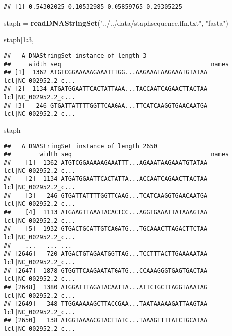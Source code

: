 \documentclass[]{article}
\newenvironment{Shaded}{\begin{snugshade}}{\end{snugshade}}
\newcommand{\KeywordTok}[1]{\textcolor[rgb]{0.13,0.29,0.53}{\textbf{#1}}}
\newcommand{\DecValTok}[1]{\textcolor[rgb]{0.00,0.00,0.81}{#1}}
\newcommand{\StringTok}[1]{\textcolor[rgb]{0.31,0.60,0.02}{#1}}
\newcommand{\OperatorTok}[1]{\textcolor[rgb]{0.81,0.36,0.00}{\textbf{#1}}}
\newcommand{\NormalTok}[1]{#1}
\begin{document}
\begin{verbatim}
## [1] 0.54302025 0.10532985 0.05859765 0.29305225
\end{verbatim}

\begin{Shaded}
\begin{Highlighting}[]
\NormalTok{staph =}\StringTok{ }\KeywordTok{readDNAStringSet}\NormalTok{(}\StringTok{"../../data/staphsequence.ffn.txt"}\NormalTok{, }\StringTok{"fasta"}\NormalTok{)}
\end{Highlighting}
\end{Shaded}

\begin{Shaded}
\begin{Highlighting}[]
\NormalTok{staph[}\DecValTok{1}\OperatorTok{:}\DecValTok{3}\NormalTok{, ]}
\end{Highlighting}
\end{Shaded}

\begin{verbatim}
##   A DNAStringSet instance of length 3
##     width seq                                          names               
## [1]  1362 ATGTCGGAAAAAGAAATTTGG...AAGAAATAAGAAATGTATAA lcl|NC_002952.2_c...
## [2]  1134 ATGATGGAATTCACTATTAAA...TACCAATCAGAACTTACTAA lcl|NC_002952.2_c...
## [3]   246 GTGATTATTTTGGTTCAAGAA...TTCATCAAGGTGAACAATGA lcl|NC_002952.2_c...
\end{verbatim}

\begin{Shaded}
\begin{Highlighting}[]
\NormalTok{staph}
\end{Highlighting}
\end{Shaded}

\begin{verbatim}
##   A DNAStringSet instance of length 2650
##        width seq                                       names               
##    [1]  1362 ATGTCGGAAAAAGAAATTT...AGAAATAAGAAATGTATAA lcl|NC_002952.2_c...
##    [2]  1134 ATGATGGAATTCACTATTA...ACCAATCAGAACTTACTAA lcl|NC_002952.2_c...
##    [3]   246 GTGATTATTTTGGTTCAAG...TCATCAAGGTGAACAATGA lcl|NC_002952.2_c...
##    [4]  1113 ATGAAGTTAAATACACTCC...AGGTGAAATTATAAAGTAA lcl|NC_002952.2_c...
##    [5]  1932 GTGACTGCATTGTCAGATG...TGCAAACTTAGACTTCTAA lcl|NC_002952.2_c...
##    ...   ... ...
## [2646]   720 ATGACTGTAGAATGGTTAG...TCCTTTACTTGAAAAATAA lcl|NC_002952.2_c...
## [2647]  1878 GTGGTTCAAGAATATGATG...CCAAAGGGTGAGTGACTAA lcl|NC_002952.2_c...
## [2648]  1380 ATGGATTTAGATACAATTA...ATTCTGCTTAGGTAAATAG lcl|NC_002952.2_c...
## [2649]   348 TTGGAAAAAGCTTACCGAA...TAATAAAAAGATTAAGTAA lcl|NC_002952.2_c...
## [2650]   138 ATGGTAAAACGTACTTATC...TAAAGTTTTATCTGCATAA lcl|NC_002952.2_c...
\end{verbatim}
\end{document}
